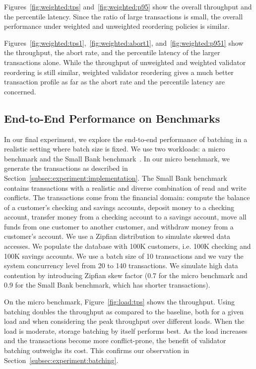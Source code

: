 Figures~\ref{fig:weighted:tps} and~\ref{fig:weighted:p95} show the overall throughput and the percentile latency. Since the ratio of large transactions is small, the overall performance under weighted and unweighted reordering policies is similar.

Figures~\ref{fig:weighted:tps1},~\ref{fig:weighted:abort1}, and~\ref{fig:weighted:p951} show the throughput, the abort rate, and the percentile latency of the larger transactions alone. While the throughput of unweighted and weighted validator reordering is still similar, weighted validator reordering gives a much better transaction profile as far as the abort rate and the percentile latency are concerned.

\subsection{End-to-End Performance on Benchmarks}
\label{subsec:experiment:end2end}
In our final experiment, we explore the end-to-end performance of batching in a realistic setting where batch size is fixed. We use two workloads: a micro benchmark and the Small Bank benchmark~\cite{alomari2008icde}. In our micro benchmark,  we generate the transactions as described in Section~\ref{subsec:experiment:implementation}.  The Small Bank benchmark contains transactions with a realistic and diverse combination of read and write conflicts. The transactions come from the financial domain: compute the balance of a customer's checking and savings accounts, deposit money to a checking account, transfer money from a checking account to a savings account, move all funds from one customer to another customer, and withdraw money from a customer's account. We use a Zipfian distribution to simulate skewed data accesses. We populate the database with 100K customers, i.e. 100K checking and 100K savings accounts. We use a batch size of 10 transactions and we vary the system concurrency level from 20 to 140 transactions. We simulate high data contention by introducing Zipfian skew factor (0.7 for the micro benchmark and 0.9 for the Small Bank benchmark, which has shorter transactions).


On the micro benchmark, Figure~\ref{fig:load:tps} shows the throughput. 
Using batching doubles the throughput as compared to the baseline, both for a given load and when considering the peak throughput over different loads. When the load is moderate, storage batching by itself performs best. As the load increases and the transactions become more conflict-prone, the benefit of validator batching outweighs its cost. This confirms our observation in Section~\ref{subsec:experiment:batching}. 

